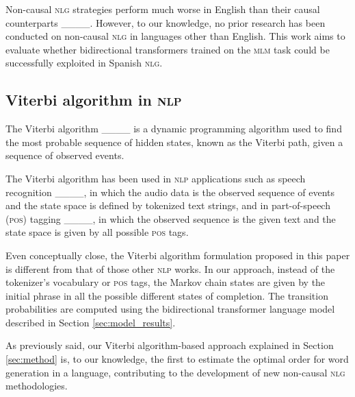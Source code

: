 Non-causal \textsc{nlg} strategies perform much worse in English than their causal counterparts ____. However, to our knowledge, no prior research has been conducted on non-causal \textsc{nlg} in languages other than English. This work aims to evaluate whether bidirectional transformers trained on the \textsc{mlm} task could be successfully exploited in Spanish \textsc{nlg}.

\subsection{Viterbi algorithm in \textsc{nlp} }
The Viterbi algorithm ____ is a dynamic programming algorithm used to find the most probable sequence of hidden states, known as the Viterbi path, given a sequence of observed events.

The Viterbi algorithm has been used in \textsc{nlp} applications such as speech recognition ____, in which the audio data is the observed sequence of events and the state space is defined by tokenized text strings, and in part-of-speech (\textsc{pos}) tagging ____, in which the observed sequence is the given text and the state space is given by all possible \textsc{pos} tags. 

Even conceptually close, the Viterbi algorithm formulation proposed in this paper is different from that of those other \textsc{nlp} works. In our approach, instead of the tokenizer's vocabulary or \textsc{pos} tags, the Markov chain states are given by the initial phrase in all the possible different states of completion. The transition probabilities are computed using the bidirectional transformer language model described in Section \ref{sec:model_results}.

As previously said, our Viterbi algorithm-based approach explained in Section \ref{sec:method} is, to our knowledge, the first to estimate the optimal order for word generation in a language, contributing to the development of new non-causal \textsc{nlg} methodologies.